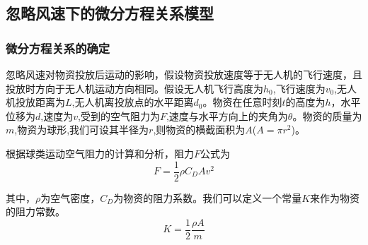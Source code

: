 \documentclass[normalsize]{ctexart}
\begin{document}
\subsection{忽略风速下的微分方程关系模型}
\subsubsection{微分方程关系的确定}忽略风速对物资投放后运动的影响，假设物资投放速度等于无人机的飞行速度，且投放时方向于无人机运动方向相同。假设无人机飞行高度为$h_0$,飞行速度为$v_0$,无人机投放距离为$L$,无人机离投放点的水平距离$d_0$。物资在任意时刻$t$的高度为$h$，水平位移为$d$,速度为$v$,受到的空气阻力为$F$,速度与水平方向上的夹角为$\theta$。物资的质量为$m$,物资为球形,我们可设其半径为$r$,则物资的横截面积为$A$($A=\pi r^2$)。
\par 根据球类运动空气阻力的计算和分析\cite{ref1}，阻力$F$公式为
\begin{equation}
	F=\frac{1}{2}\rho C_D Av^2
\end{equation}
\par 其中，$\rho$为空气密度，$C_D$为物资的阻力系数。我们可以定义一个常量$K$来作为物资的阻力常数。
\begin{equation}
	K = \frac{1}{2}\frac{\rho A}{m}
\end{equation}
\end{document}
